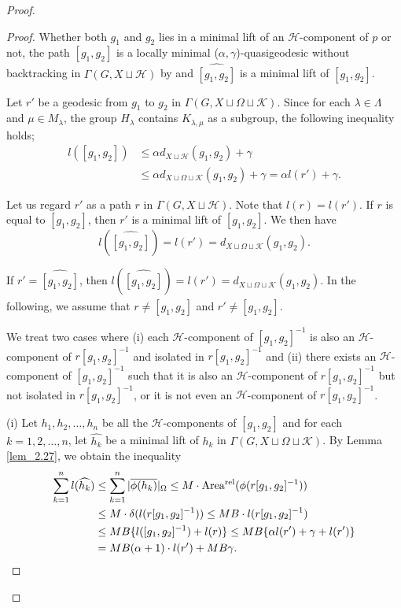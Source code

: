 \documentclass{amsart}
\theoremstyle{definition}
\begin{document}
\begin{proof}
\begin{proof}
Whether both $g_1$ and $g_2$ lies in a minimal lift of an ${\mathcal H}$-component of $p$ or not, the path $[g_1,g_2]$ is a locally minimal ($\alpha,\gamma$)-quasigeodesic without backtracking in $\Gamma(G,X\sqcup {\mathcal H})$ by \cite[Lemma 3.5]{Osi06} and $\widehat{[g_1,g_2]}$ is a minimal lift of $[g_1,g_2]$. 

Let $r'$ be a geodesic from $g_1$ to $g_2$ in $\Gamma(G,X\sqcup \Omega\sqcup{\mathcal K})$. 
Since for each $\lambda\in\Lambda$ and $\mu\in M_\lambda$, the group $H_{\lambda}$ contains $K_{\lambda,\mu}$ as a subgroup, the following inequality holds; 
\begin{equation*}
\begin{split}
l([g_1,g_2])&\leq \alpha  d_{X\sqcup {\mathcal H}}(g_1,g_2)+\gamma\\ 
&\leq \alpha d_{X\sqcup \Omega\sqcup{\mathcal K}}(g_1,g_2)+\gamma=\alpha l(r')+\gamma.
\end{split}
\end{equation*}

Let us regard $r'$ as a path $r$ in $\Gamma(G,X\sqcup {\mathcal H})$. 
Note that $l(r)=l(r')$. 
If $r$ is equal to $[g_1,g_2]$, then $r'$ is a minimal lift of $[g_1,g_2]$. 
We then have
\begin{equation*}
l(\widehat{[g_1,g_2]})
=l(r')=d_{X\sqcup \Omega\sqcup{\mathcal K}}(g_1,g_2).
\end{equation*}

If $r'=\widehat{[g_1,g_2]}$, then $l(\widehat{[g_1,g_2]})=l(r')=d_{X\sqcup\Omega\sqcup{\mathcal K}}(g_1,g_2)$. 
In the following, we assume that $r\ne[g_1,g_2]$ and $r'\ne\widehat{[g_1,g_2]}$. 

We treat two cases where (i) each ${\mathcal H}$-component of $[g_1,g_2]^{-1}$ is also an ${\mathcal H}$-component of $r[g_1,g_2]^{-1}$ and isolated in $r[g_1,g_2]^{-1}$ and (ii) there exists an ${\mathcal H}$-component of $[g_1,g_2]^{-1}$ such that it is also an ${\mathcal H}$-component of $r[g_1,g_2]^{-1}$ but not isolated in $r[g_1,g_2]^{-1}$, or it is not even an ${\mathcal H}$-component of $r[g_1,g_2]^{-1}$. 

(i) Let $h_1,h_2,\ldots,h_n$ be all the ${\mathcal H}$-components of $[g_1,g_2]$ and for each $k=1,2,\ldots,n$, let $\widehat{h_k}$ be a minimal lift of $h_k$ in $\Gamma(G,X\sqcup\Omega\sqcup {\mathcal K})$. 
By Lemma \ref{lem_2.27}, we obtain the inequality
\begin{equation*}
\begin{split}
\sum_{k=1}^{n} l(\widehat{h_k}) &\leq \sum_{k=1}^n |\overline{\phi(h_k)}|_\Omega \leq M\cdot {{\rm Area^{rel}}}(\phi(r[g_1,g_2]^{-1}))\\
&\leq M\cdot \delta(l(r[g_1,g_2]^{-1}))\leq MB\cdot l(r[g_1,g_2]^{-1})\\
&\leq MB\{ l([g_1,g_2]^{-1})+l(r) \} \leq MB\{ \alpha  l(r')+\gamma+l(r') \}\\
&= MB(\alpha+1)\cdot l(r')+MB\gamma. 
\end{split}
\end{equation*}


\end{proof}
\end{proof}
\end{document}
